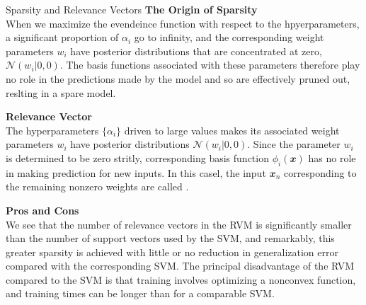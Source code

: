 \documentclass{bredelebeamer}
\begin{document}
\begin{frame}{Sparsity and Relevance Vectors}
  \textbf{The Origin of Sparsity} \\
  When we maximize the evendeince function with respect to the hpyerparameters,
  a significant proportion of $\alpha_i$ go to infinity, and the corresponding
  weight parameters $w_i$ have posterior distributions that are concentrated at
  zero, $\mathcal{N} (w_i | 0, 0)$. The basis functions associated with these
  parameters therefore play no role in the predictions made by the model and so
  are effectively pruned out, reslting in a spare model.
  \vspace{1.0\baselineskip}

  \textbf{Relevance Vector} \\
  The hyperparameters $\{\alpha_i\}$ driven to large values makes its associated
  weight parameters $w_i$ have posterior distributions $\mathcal{N} (w_i | 0, 0)$.
  Since the parameter $w_i$ is determined to be zero stritly, corresponding basis
  function $\phi_i(\mathbfit{x})$ has no role in making prediction for new inputs.
  In this casel, the input $\mathbfit{x}_n$ corresponding to the remaining nonzero
  weights are called .

  \vspace{1.0\baselineskip}

  \textbf{Pros and Cons} \\
  We see that the number of relevance vectors in the RVM is significantly smaller
  than the number of support vectors used by the SVM, and remarkably, this greater
  sparsity is achieved with little or no reduction in generalization error compared
  with the corresponding SVM.
  The principal disadvantage of the RVM compared to the SVM is that training involves
  optimizing a nonconvex function, and training times can be longer than for a comparable SVM.
\end{frame}
\end{document}
